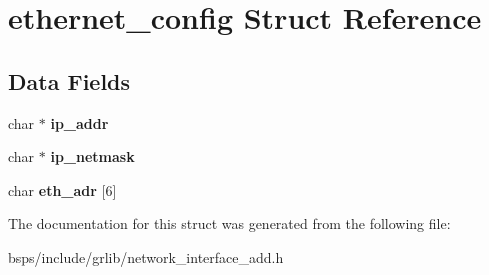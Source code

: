 \hypertarget{structethernet__config}{}\section{ethernet\+\_\+config Struct Reference}
\label{structethernet__config}
\subsection*{Data Fields}
\begin{DoxyCompactItemize}
\item 
\mbox{\label{structethernet__config_a0f2c6a4786edec0a4f5ddde1b8108a3f}} 
char $\ast$ {\bfseries ip\+\_\+addr}
\item 
\mbox{\label{structethernet__config_a7119e86aa58c0aa75d6febcf2953d96d}} 
char $\ast$ {\bfseries ip\+\_\+netmask}
\item 
\mbox{\label{structethernet__config_ad866b31ece5496b6ad75e9386f5019a3}} 
char {\bfseries eth\+\_\+adr} \mbox{[}6\mbox{]}
\end{DoxyCompactItemize}


The documentation for this struct was generated from the following file\+:\begin{DoxyCompactItemize}
\item 
bsps/include/grlib/network\+\_\+interface\+\_\+add.\+h\end{DoxyCompactItemize}

